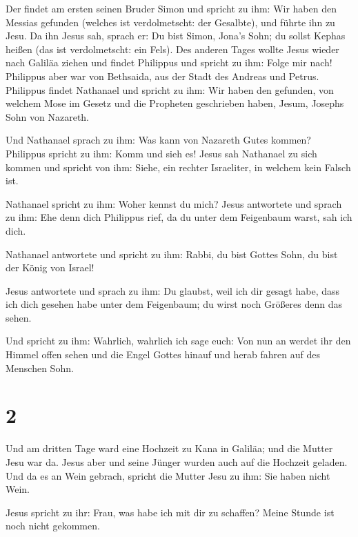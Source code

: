  Der findet am ersten seinen Bruder Simon und spricht zu
ihm: Wir haben den Messias gefunden (welches ist verdolmetscht: der
Gesalbte),  und führte ihn zu Jesu. Da ihn Jesus sah,
sprach er: Du bist Simon, Jona's Sohn; du sollst Kephas heißen (das ist
verdolmetscht: ein Fels).  Des anderen Tages wollte Jesus
wieder nach Galiläa ziehen und findet Philippus und spricht zu ihm:
Folge mir nach!  Philippus aber war von Bethsaida, aus
der Stadt des Andreas und Petrus.  Philippus findet
Nathanael und spricht zu ihm: Wir haben den gefunden, von welchem Mose
im Gesetz und die Propheten geschrieben haben, Jesum, Josephs Sohn von
Nazareth.

 Und Nathanael sprach zu ihm: Was kann von Nazareth Gutes
kommen? Philippus spricht zu ihm: Komm und sieh es! 
Jesus sah Nathanael zu sich kommen und spricht von ihm: Siehe, ein
rechter Israeliter, in welchem kein Falsch ist.

 Nathanael spricht zu ihm: Woher kennst du mich? Jesus
antwortete und sprach zu ihm: Ehe denn dich Philippus rief, da du unter
dem Feigenbaum warst, sah ich dich.

 Nathanael antwortete und spricht zu ihm: Rabbi, du bist
Gottes Sohn, du bist der König von Israel!

 Jesus antwortete und sprach zu ihm: Du glaubst, weil ich
dir gesagt habe, dass ich dich gesehen habe unter dem Feigenbaum; du
wirst noch Größeres denn das sehen.

 Und spricht zu ihm: Wahrlich, wahrlich ich sage euch:
Von nun an werdet ihr den Himmel offen sehen und die Engel Gottes hinauf
und herab fahren auf des Menschen Sohn.

\hypertarget{section-1}{%
\section{2}\label{section-1}}

 Und am dritten Tage ward eine Hochzeit zu Kana in
Galiläa; und die Mutter Jesu war da.  Jesus aber und seine
Jünger wurden auch auf die Hochzeit geladen.  Und da es an
Wein gebrach, spricht die Mutter Jesu zu ihm: Sie haben nicht Wein.

 Jesus spricht zu ihr: Frau, was habe ich mit dir zu
schaffen? Meine Stunde ist noch nicht gekommen.

